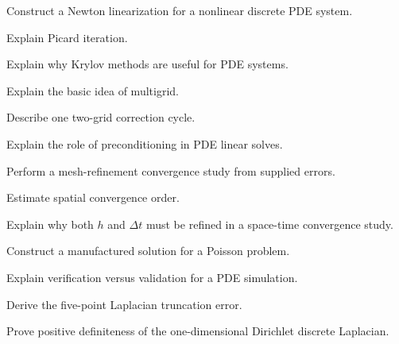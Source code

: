 \begin{exercise}[3]
Construct a Newton linearization for a nonlinear discrete PDE system.
\end{exercise}

\begin{exercise}[3]
Explain Picard iteration.
\end{exercise}

\begin{exercise}[3]
Explain why Krylov methods are useful for PDE systems.
\end{exercise}

\begin{exercise}[3]
Explain the basic idea of multigrid.
\end{exercise}

\begin{exercise}[3]
Describe one two-grid correction cycle.
\end{exercise}

\begin{exercise}[3]
Explain the role of preconditioning in PDE linear solves.
\end{exercise}

\begin{exercise}[3]
Perform a mesh-refinement convergence study from supplied errors.
\end{exercise}

\begin{exercise}[3]
Estimate spatial convergence order.
\end{exercise}

\begin{exercise}[3]
Explain why both \(h\) and \(\Delta t\) must be refined in a
space-time convergence study.
\end{exercise}

\begin{exercise}[3]
Construct a manufactured solution for a Poisson problem.
\end{exercise}

\begin{exercise}[3]
Explain verification versus validation for a PDE simulation.
\end{exercise}

\begin{exercise}[4]
Derive the five-point Laplacian truncation error.
\end{exercise}

\begin{exercise}[4]
Prove positive definiteness of the one-dimensional Dirichlet discrete
Laplacian.
\end{exercise}

